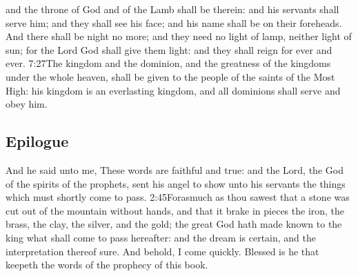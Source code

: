 and the throne of God and of the Lamb shall be therein: and his servants shall serve him; 
and they shall see his face;%
and his name shall be on their foreheads. 
And there shall be night no more; and they need no light of lamp, neither light of sun; for the Lord God shall give them light:%
and they shall reign for ever and ever.%
					{7:27}{The kingdom and the dominion, and the greatness of the kingdoms under the whole heaven, shall be given to the people of the saints of the Most High: his kingdom is an everlasting kingdom, and all dominions shall serve and obey him.}
					
\subsection*{Epilogue}

And he said unto me, These words are faithful and true: and the Lord, the God of the spirits of the prophets, sent his angel to show unto his servants the things which must shortly come to pass.%
			{2:45}{Forasmuch as thou sawest that a stone was cut out of the mountain without hands, and that it brake in pieces the iron, the brass, the clay, the silver, and the gold; the great God hath made known to the king what shall come to pass hereafter: and the dream is certain, and the interpretation thereof sure.} %
And behold, I come quickly.%
Blessed is he that keepeth the words of the prophecy of this book.

